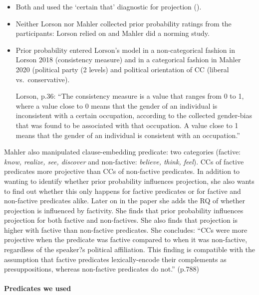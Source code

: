 \documentclass[11pt,fleqn]{article}
\newcommand{\6}{\mbox{$[\hspace*{-.6mm}[$}}
\newcommand{\9}{\mbox{$]\hspace*{-.6mm}]$}}
\begin{document}
\begin{itemize}

\item Both \citealt{lorson2018} and \citealt{mahler2020} used the `certain that' diagnostic for projection (\citealt{tbd-variability}).

\item Neither Lorson nor Mahler collected prior probability ratings from the participants: Lorson relied on \citealt{boyce-etal2018} and Mahler did a norming study.

\item Prior probability entered Lorson's model in a non-categorical fashion in Lorson 2018 (consistency measure) and in a categorical fashion in Mahler 2020 (political party (2 levels) and political orientation of CC (liberal vs.\ conservative). 

Lorson, p.36: ``The consistency measure is a value that ranges from 0 to 1, where a value close to 0 means that the gender of an individual is inconsistent with a certain occupation, according to the collected gender-bias that was found to be associated with that occupation. A value close to 1 means that the gender of an individual is consistent with an occupation.''

\end{itemize}

Mahler also manipulated clause-embedding predicate: two categories (factive: {\em know, realize, see, discover} and non-factive: {\em believe, think, feel}). CCs of factive predicates more projective than CCs of non-factive predicates. In addition to wanting to identify whether prior probability influences projection, she also wants to find out whether this only happens for factive predicates or for factive and non-factive predicates alike. Later on in the paper she adds the RQ of whether projection is influenced by factivity. She finds that prior probability influences projection for both factive and non-factives.  She also finds that projection is higher with factive than non-factive predicates. She concludes: ``CCs were more projective when the predicate was factive compared to when it was non-factive, regardless of the speaker?s political affiliation. This finding is compatible with the assumption that factive predicates lexically-encode their complements as presuppositions, whereas non-factive predicates do not.'' (p.788)

\newpage

\paragraph{Predicates we used}
\end{document}
